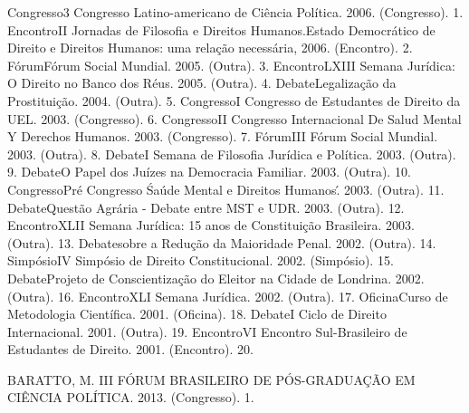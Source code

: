 

\begin{cvhonors}
  \cvhonor
    {Congresso}{3 Congresso Latino-americano de Ciência Política. 2006. (Congresso).}
    {}
    {1.}
  \cvhonor
    {Encontro}{II Jornadas de Filosofia e Direitos Humanos.Estado Democrático de Direito e Direitos Humanos: uma relação necessária, 2006. (Encontro).}
    {}
    {2.}
  \cvhonor
    {Fórum}{Fórum Social Mundial. 2005. (Outra).}
    {}
    {3.}
  \cvhonor
    {Encontro}{LXIII Semana Jurídica: O Direito no Banco dos Réus. 2005. (Outra).}
    {}
    {4.}
  \cvhonor
    {Debate}{Legalização da Prostituição. 2004. (Outra).}
    {}
    {5.}
  \cvhonor
    {Congresso}{I Congresso de Estudantes de Direito da UEL. 2003. (Congresso).}
    {}
    {6.}
  \cvhonor
    {Congresso}{II Congresso Internacional De Salud Mental Y Derechos Humanos. 2003. (Congresso).}
    {}
    {7.}
  \cvhonor
    {Fórum}{III Fórum Social Mundial. 2003. (Outra).}
    {}
    {8.}
  \cvhonor
    {Debate}{I Semana de Filosofia Jurídica e Política. 2003. (Outra).}
    {}
    {9.}
  \cvhonor
    {Debate}{O Papel dos Juízes na Democracia Familiar. 2003. (Outra).}
    {}
    {10.}
  \cvhonor
    {Congresso}{Pré Congresso \'Saúde Mental e Direitos Humanos\'. 2003. (Outra).}
    {}
    {11.}
  \cvhonor
    {Debate}{Questão Agrária - Debate entre MST e UDR. 2003. (Outra).}
    {}
    {12.}
  \cvhonor
    {Encontro}{XLII Semana Jurídica: 15 anos de Constituição Brasileira. 2003. (Outra).}
    {}
    {13.}
  \cvhonor
    {Debate}{sobre a Redução da Maioridade Penal. 2002. (Outra).}
    {}
    {14.}
  \cvhonor
    {Simpósio}{IV Simpósio de Direito Constitucional. 2002. (Simpósio).}
    {}
    {15.}
  \cvhonor
    {Debate}{Projeto de Conscientização do Eleitor na Cidade de Londrina. 2002. (Outra).}
    {}
    {16.}
  \cvhonor
    {Encontro}{XLI Semana Jurídica. 2002. (Outra).}
    {}
    {17.}
  \cvhonor
    {Oficina}{Curso de Metodologia Científica. 2001. (Oficina).}
    {}
    {18.}
  \cvhonor
    {Debate}{I Ciclo de Direito Internacional. 2001. (Outra).}
    {}
    {19.}
  \cvhonor
    {Encontro}{VI Encontro Sul-Brasileiro de Estudantes de Direito. 2001. (Encontro).}
    {}
    {20.}
\end{cvhonors}


\begin{cvhonors}
  \cvhonor
    {BARATTO, M.}
    {III FÓRUM BRASILEIRO DE PÓS-GRADUAÇÃO EM CIÊNCIA POLÍTICA. 2013. (Congresso).}
    {}
    {1. }
\end{cvhonors}
